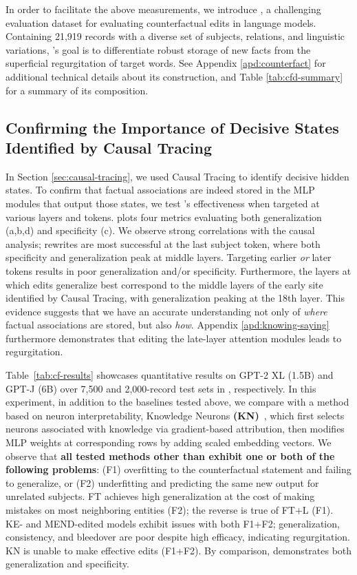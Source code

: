 In order to facilitate the above measurements, we introduce \cfd, a challenging evaluation dataset for evaluating counterfactual edits in language models. Containing 21,919 records with a diverse set of subjects, relations, and linguistic variations, \cfd's goal is to differentiate robust storage of new facts from the superficial regurgitation of target words. See Appendix \ref{apd:counterfact} for additional technical details about its construction, and Table \ref{tab:cfd-summary} for a summary of its composition.


\subsection{Confirming the Importance of Decisive States Identified by Causal Tracing}
\label{subsec:romeeval-mlp}


In Section \ref{sec:causal-tracing}, we used Causal Tracing to identify decisive hidden states. To confirm that factual associations are indeed stored in the MLP modules that output those states, we test \method's effectiveness when targeted at various layers and tokens.
 plots four metrics evaluating both generalization (a,b,d) and specificity (c). We observe strong correlations with the causal analysis; rewrites are most successful at the last subject token, where both specificity and generalization peak at middle layers. Targeting earlier \textit{or} later tokens results in poor generalization and/or specificity. Furthermore, the layers at which edits generalize best correspond to the middle layers of the early site identified by Causal Tracing, with generalization peaking at the 18th layer. This evidence suggests that we have an accurate understanding not only of \textit{where} factual associations are stored, but also \textit{how}. Appendix \ref{apd:knowing-saying} furthermore demonstrates that editing the late-layer attention modules leads to regurgitation.


Table~\ref{tab:cf-results} showcases quantitative results on GPT-2 XL (1.5B) and GPT-J (6B) over 7,500 and 2,000-record test sets in \cfd, respectively.  In this experiment, in addition to the baselines tested above, we compare with a method based on neuron interpretability, Knowledge Neurons \textbf{(KN)}~\citep{dai-kn}, which first selects neurons associated with knowledge via gradient-based attribution, then modifies MLP weights %
at corresponding rows by adding scaled embedding vectors.  We observe that \textbf{all tested methods other than \method exhibit one or both of the following problems}: (F1) overfitting to the counterfactual statement and failing to generalize, or (F2) underfitting and predicting the same new output for unrelated subjects. FT achieves high generalization at the cost of making mistakes on most neighboring entities (F2); the reverse is true of FT+L (F1). KE- and \mbox{MEND-edited} models exhibit issues with both F1+F2; generalization, consistency, and bleedover are poor despite high efficacy, indicating regurgitation. KN is unable to make effective edits (F1+F2). By comparison, \method demonstrates both generalization and specificity.

